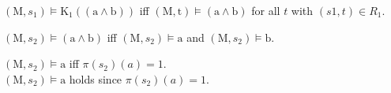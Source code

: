 \documentclass{article}
\newcommand{\normal}[1]{#1}
\begin{document}
{\fontsize{35}{42}\selectfont 
	\normal{\noindent$\left(\text{M}, s_1 \right) \models  \text{K}_{\text{1}} \left(\left(\text{a}\land\text{b}\right)\right)$ iff $\left(\text{M}, \text{t} \right) \models \left(\text{a}\land\text{b}\right)$ for all $t$ with $(s1, t) \in R_{1}$.}

	\hfill\begin{minipage}{\dimexpr\textwidth-0.1\textwidth}
			\normal{$\left(\text{M}, s_2 \right) \models \left(\text{a}\land\text{b}\right)$ iff $\left(\text{M}, s_2 \right) \models \text{a}$ and $\left(\text{M}, s_2 \right) \models \text{b}$. }

			\hfill\begin{minipage}{\dimexpr\textwidth-0.1\textwidth}
				\normal{$\left(\text{M}, s_2 \right) \models \text{a}$ iff $\pi\left(s_2\right)\left( a \right) = 1$. 
				~\\
	 			$\left(\text{M}, s_2 \right) \models \text{a}$ holds since $\pi\left(s_2\right)\left( a \right) = 1$.}
	 			~\\
	 		\end{minipage}
	\end{minipage}

}
\end{document}
